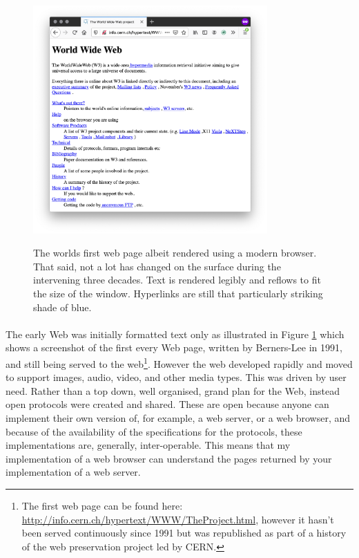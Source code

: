 \begin{figure}[H]
\centering
\includegraphics[width=0.8\textwidth]{figures/first-web-page}
\label{fig:first-web-page}
\caption{The worlds first web page albeit rendered using a modern browser. That said, not a lot has changed on the surface during the intervening three decades. Text is rendered legibly and reflows to fit the size of the window. Hyperlinks are still that particularly striking shade of blue.}
\end{figure}


\paragraph{} The early Web was initially formatted text only as illustrated in Figure \ref{fig:first-web-page} which shows a screenshot of the first every Web page, written by Berners-Lee in 1991, and still being served to the web\footnote{The first web page can be found here: \url{http://info.cern.ch/hypertext/WWW/TheProject.html}, however it hasn't been served continuously since 1991 but was republished as part of a history of the web preservation project led by CERN.}. However the web developed rapidly and moved to support images, audio, video, and other media types. This was driven by user need. Rather than a top down, well organised, grand plan for the Web, instead open protocols were created and shared. These are open because anyone can implement their own version of, for example, a web server, or a web browser, and because of the availability of the specifications for the protocols, these implementations are, generally, inter-operable. This means that my implementation of a web browser can understand the pages returned by your implementation of a web server.
